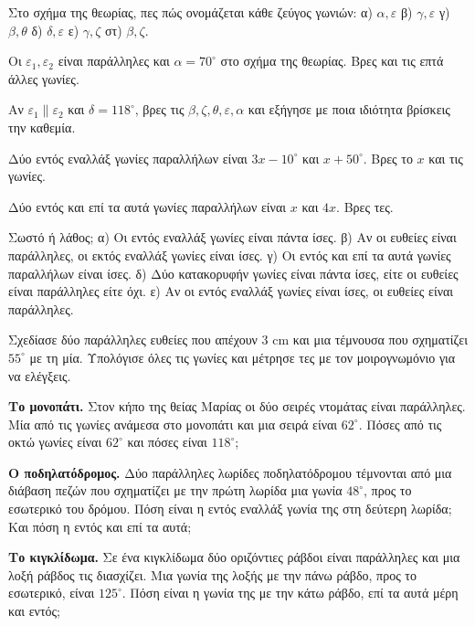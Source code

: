 

\ex Στο σχήμα της θεωρίας, πες πώς ονομάζεται κάθε ζεύγος γωνιών: α) $\alpha,\varepsilon$ β) $\gamma,\varepsilon$ γ) $\beta,\theta$ δ) $\delta,\varepsilon$ ε) $\gamma,\zeta$ στ) $\beta,\zeta$.

\ex Οι $\varepsilon_1,\varepsilon_2$ είναι παράλληλες και $\alpha=70^\circ$ στο σχήμα της θεωρίας. Βρες και τις επτά άλλες γωνίες.

\ex Αν $\varepsilon_1\parallel\varepsilon_2$ και $\delta=118^\circ$, βρες τις $\beta,\zeta,\theta,\varepsilon,\alpha$ και εξήγησε με ποια ιδιότητα βρίσκεις την καθεμία.

\ex Δύο εντός εναλλάξ γωνίες παραλλήλων είναι $3x-10^\circ$ και $x+50^\circ$. Βρες το $x$ και τις γωνίες.

\ex Δύο εντός και επί τα αυτά γωνίες παραλλήλων είναι $x$ και $4x$. Βρες τες.

\ex Σωστό ή λάθος; α) Οι εντός εναλλάξ γωνίες είναι πάντα ίσες. β) Αν οι ευθείες είναι παράλληλες, οι εκτός εναλλάξ γωνίες είναι ίσες. γ) Οι εντός και επί τα αυτά γωνίες παραλλήλων είναι ίσες. δ) Δύο κατακορυφήν γωνίες είναι πάντα ίσες, είτε οι ευθείες είναι παράλληλες είτε όχι. ε) Αν οι εντός εναλλάξ γωνίες είναι ίσες, οι ευθείες είναι παράλληλες.

\ex Σχεδίασε δύο παράλληλες ευθείες που απέχουν $3$ cm και μια τέμνουσα που σχηματίζει $55^\circ$ με τη μία. Υπολόγισε όλες τις γωνίες και μέτρησε τες με τον μοιρογνωμόνιο για να ελέγξεις.


\ex \textbf{Το μονοπάτι.} Στον κήπο της θείας Μαρίας οι δύο σειρές ντομάτας είναι παράλληλες. Μία από τις γωνίες ανάμεσα στο μονοπάτι και μια σειρά είναι $62^\circ$. Πόσες από τις οκτώ γωνίες είναι $62^\circ$ και πόσες είναι $118^\circ$;

\ex \textbf{Ο ποδηλατόδρομος.} Δύο παράλληλες λωρίδες ποδηλατόδρομου τέμνονται από μια διάβαση πεζών που σχηματίζει με την πρώτη λωρίδα μια γωνία $48^\circ$, προς το εσωτερικό του δρόμου. Πόση είναι η εντός εναλλάξ γωνία της στη δεύτερη λωρίδα; Και πόση η εντός και επί τα αυτά;

\ex \textbf{Το κιγκλίδωμα.} Σε ένα κιγκλίδωμα δύο οριζόντιες ράβδοι είναι παράλληλες και μια λοξή ράβδος τις διασχίζει. Μια γωνία της λοξής με την πάνω ράβδο, προς το εσωτερικό, είναι $125^\circ$. Πόση είναι η γωνία της με την κάτω ράβδο, επί τα αυτά μέρη και εντός;

